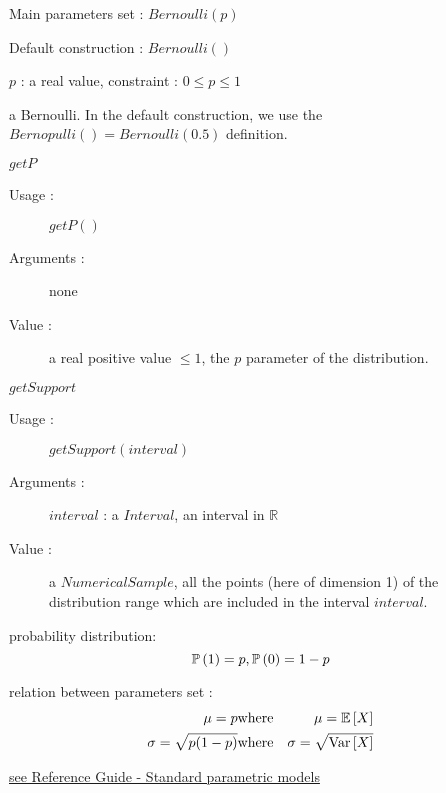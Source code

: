 \begin{description}

\item[Usage :]\rule{0pt}{1em}
  \begin{description}
  \item Main parameters set : $Bernoulli(p)$
  \item  Default construction : $Bernoulli()$
  \end{description}

\item[Arguments :]  $p$ : a real value,
  constraint : $0\leq p\leq 1$

\item[Value :] a Bernoulli. In the default construction, we use the $Bernopulli() = Bernoulli(0.5)$ definition.

\item[Some methods :] \rule{0pt}{1em}
  \begin{description}

  \item $getP$
    \begin{description}
    \item[Usage :] $getP()$
    \item[Arguments :] none
    \item[Value :]  a real positive value $\leq 1$, the $p$ parameter of the  distribution.
    \end{description}
    \bigskip

  \item $getSupport$
    \begin{description}
    \item[Usage :] $getSupport(interval)$
    \item[Arguments :] $interval$ : a $Interval$, an interval in $\mathbb{R}$
    \item[Value :]  a $NumericalSample$, all the points (here of dimension 1) of the distribution range which are included in the interval $interval$.
    \end{description}

  \end{description}

\item[Details :]  \rule{0pt}{1em}
  \begin{description}
  \item probability distribution:
    $$
    {\mathbb P}\left( 1 \right)  = p, {\mathbb P}\left( 0 \right) = 1-p
    $$
  \item relation between parameters set :
    \begin{eqnarray*}
      \mu  =   p                                              & \mbox{where}& \mu ={\mathbb E}\left[ X \right] \\
      \sigma  = \sqrt{p(1-p)}  & \mbox{where}& \sigma =\sqrt{{\rm Var}\left[ X \right] }
    \end{eqnarray*}

  \end{description}
  \bigskip

\item[Links :]  \rule{0pt}{1em}
  \href{OpenTURNS_ReferenceGuide.pdf}{see Reference Guide - Standard parametric models}
\end{description}


